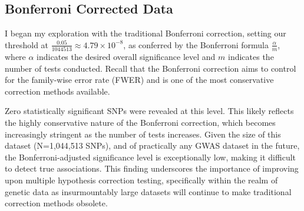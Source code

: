 \documentclass[12pt]{article}
\begin{document}
\subsection{Bonferroni Corrected Data}
I began my exploration with the traditional Bonferroni correction, setting our threshold at \( \frac{0.05}{1044513} \approx 4.79 \times 10^{-8} \), as conferred by the Bonferroni formula \( \frac{\alpha}{m} \), where \( \alpha \) indicates the desired overall significance level and \( m \) indicates the number of tests conducted. Recall that the Bonferroni correction aims to control for the family-wise error rate (FWER) and is one of the most conservative correction methods available.

Zero statistically significant SNPs were revealed at this level. This likely reflects the highly conservative nature of the Bonferroni correction, which becomes increasingly stringent as the number of tests increases. Given the size of this dataset (N=1,044,513 SNPs), and of practically any GWAS dataset in the future, the Bonferroni-adjusted significance level is exceptionally low, making it difficult to detect true associations. This finding underscores the importance of improving upon multiple hypothesis correction testing, specifically within the realm of genetic data as insurmountably large datasets will continue to make traditional correction methods obsolete. \par
\end{document}

